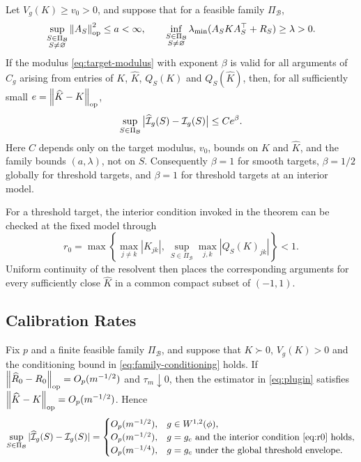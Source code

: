 \begin{theorem}
\label{thm:uniform-error}
Let $V_g(K)\ge v_0>0$, and suppose that for a feasible family $\Pi_{\mathcal B}$,
\begin{equation}
\sup_{\substack{S\in\Pi_{\mathcal B}\\S\ne\varnothing}}
\left\lVert A_S \right\rVert_{\mathrm{op}}^2\le a<\infty,
\qquad
\inf_{\substack{S\in\Pi_{\mathcal B}\\S\ne\varnothing}}
\lambda_{\min}(A_SKA_S^\top+R_S)\ge\lambda>0.
\label{eq:family-conditioning}
\end{equation}
If the modulus \eqref{eq:target-modulus} with exponent $\beta$ is valid for all
arguments of $C_g$ arising from entries of $K$, $\widehat K$, $Q_S(K)$ and
$Q_S(\widehat K)$, then, for all sufficiently small
$e=\left\lVert \widehat K-K \right\rVert_{\mathrm{op}}$,
\begin{equation}
\sup_{S\in\Pi_{\mathcal B}}
\big|\widehat{\mathcal{I}}_g(S)-\mathcal{I}_g(S)\big|\le C e^\beta.
\label{eq:uniform-error}
\end{equation}
Here $C$ depends only on the target modulus, $v_0$, bounds on $K$ and
$\widehat K$, and the family bounds $(a,\lambda)$, not on $S$.
Consequently $\beta=1$ for smooth targets, $\beta=1/2$ globally for threshold
targets, and $\beta=1$ for threshold targets at an interior model.
\end{theorem}

For a threshold target, the interior condition invoked in the theorem can be
checked at the fixed model through
\begin{equation}
r_0=\max\left\{\max_{j\ne k}|K_{jk}|,\ 
\sup_{S\in\Pi_{\mathcal B}}\max_{j,k}|Q_S(K)_{jk}|\right\}<1.
\label{eq:r0}
\end{equation}
Uniform continuity of the resolvent then places the corresponding arguments
for every sufficiently close $\widehat K$ in a common compact subset of
$(-1,1)$.

\subsection{Calibration Rates}

\begin{theorem}
\label{thm:fixed-model}
Fix $p$ and a finite feasible family $\Pi_{\mathcal B}$, and suppose that
$K\succ0$, $V_g(K)>0$ and the conditioning bound in
\eqref{eq:family-conditioning} holds. If
$\left\lVert \widehat R_0-R_0 \right\rVert_{\mathrm{op}}=O_p(m^{-1/2})$ and $\tau_m\downarrow0$, then the
estimator in \eqref{eq:plugin} satisfies
$\left\lVert \widehat K-K \right\rVert_{\mathrm{op}}=O_p(m^{-1/2})$. Hence
\begin{equation}
\sup_{S\in\Pi_{\mathcal B}}|\widehat{\mathcal{I}}_g(S)-\mathcal{I}_g(S)|=
\begin{cases}
O_p(m^{-1/2}), & g\in W^{1,2}(\phi),\\
O_p(m^{-1/2}), & g=g_c\text{ and the interior condition \eqref{eq:r0} holds},\\
O_p(m^{-1/4}), & g=g_c\text{ under the global threshold envelope}.
\end{cases}
\label{eq:root-m}
\end{equation}
\end{theorem}

